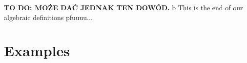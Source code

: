 \documentclass[a4paper, 12pt]{report}
\newcommand{\todo}[1]{\hfill \break \textbf{\Huge TO DO: #1 \hfill \break}\normalsize}
\begin{document}
\todo{MOŻE DAĆ JEDNAK TEN DOWÓD.} b
This is the end of our algebraic definitions pfuuuu...
\section{Examples}
\end{document}

